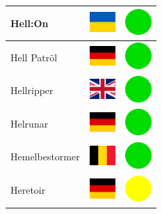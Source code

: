 \documentclass[12pt, a4paper, twoside]{report}
\begin{document}
\begin{center}
\begin{longtable}{|p{5cm}|p{2cm}|p{2cm}|}
 Hell:On                                                    & \includegraphics[width=1cm]{../img/flags/ua} &   \includegraphics[width=1cm]{../likes/y} \\ \hline
 Hell Patröl                                                & \includegraphics[width=1cm]{../img/flags/de} &   \includegraphics[width=1cm]{../likes/y} \\ \hline
 Hellripper                                                 & \includegraphics[width=1cm]{../img/flags/gb} &   \includegraphics[width=1cm]{../likes/y} \\ \hline
 Helrunar                                                   & \includegraphics[width=1cm]{../img/flags/de} &   \includegraphics[width=1cm]{../likes/y} \\ \hline
 Hemelbestormer                                             & \includegraphics[width=1cm]{../img/flags/be} &   \includegraphics[width=1cm]{../likes/y} \\ \hline
 Heretoir                                                   & \includegraphics[width=1cm]{../img/flags/de} &   \includegraphics[width=1cm]{../likes/m} \\ \hline

\end{longtable}
\end{center}
\end{document}
